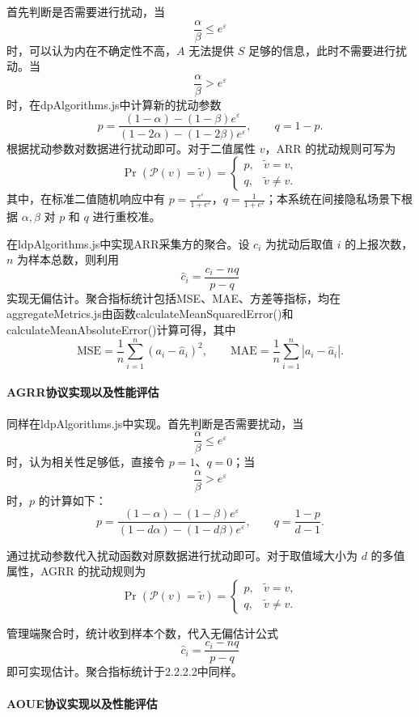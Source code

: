 \documentclass{cumcmthesis}
\numberwithin{equation}{section}
\numberwithin{figure}{section}
\numberwithin{table}{section}
\begin{document}
首先判断是否需要进行扰动，当
\[
\frac{\alpha}{\beta}\le e^{\varepsilon}
\]
时，可以认为内在不确定性不高，\(A\) 无法提供 \(S\) 足够的信息，此时不需要进行扰动。当
\[
\frac{\alpha}{\beta}> e^{\varepsilon}
\]
时，在dpAlgorithms.js中计算新的扰动参数
\[
p=\frac{(1-\alpha)-(1-\beta)e^{\varepsilon}}
{(1-2\alpha)-(1-2\beta)e^{\varepsilon}},\qquad q=1-p.
\]
根据扰动参数对数据进行扰动即可。对于二值属性 \(v\)，ARR 的扰动规则可写为
\[
\Pr(\mathcal{P}(v)=\tilde{v})=
\begin{cases}
p, & \tilde{v}=v,\\
q, & \tilde{v}\ne v.
\end{cases}
\]
其中，在标准二值随机响应中有 \(p=\frac{e^{\varepsilon}}{1+e^{\varepsilon}}\)，\(q=\frac{1}{1+e^{\varepsilon}}\)；本系统在间接隐私场景下根据 \(\alpha,\beta\) 对 \(p\) 和 \(q\) 进行重校准。

在ldpAlgorithms.js中实现ARR采集方的聚合。设 \(c_i\) 为扰动后取值 \(i\) 的上报次数，\(n\) 为样本总数，则利用
\[
\hat{c}_i=\frac{c_i-nq}{p-q}
\]
实现无偏估计。聚合指标统计包括MSE、MAE、方差等指标，均在aggregateMetrics.js由函数calculateMeanSquaredError()和calculateMeanAbsoluteError()计算可得，其中
\[
\mathrm{MSE}=\frac{1}{n}\sum_{i=1}^{n}(a_i-\hat{a}_i)^2,
\qquad
\mathrm{MAE}=\frac{1}{n}\sum_{i=1}^{n}|a_i-\hat{a}_i|.
\]

\paragraph{AGRR协议实现以及性能评估}

同样在ldpAlgorithms.js中实现。首先判断是否需要扰动，当
\[
\frac{\alpha}{\beta}\le e^{\varepsilon}
\]
时，认为相关性足够低，直接令 \(p=1\)、\(q=0\)；当
\[
\frac{\alpha}{\beta}> e^{\varepsilon}
\]
时，\(p\) 的计算如下：
\[
p=\frac{(1-\alpha)-(1-\beta)e^{\varepsilon}}
{(1-d\alpha)-(1-d\beta)e^{\varepsilon}},\qquad
q=\frac{1-p}{d-1}.
\]

通过扰动参数代入扰动函数对原数据进行扰动即可。对于取值域大小为 \(d\) 的多值属性，AGRR 的扰动规则为
\[
\Pr(\mathcal{P}(v)=\tilde{v})=
\begin{cases}
p, & \tilde{v}=v,\\
q, & \tilde{v}\ne v.
\end{cases}
\]

管理端聚合时，统计收到样本个数，代入无偏估计公式
\[
\hat{c}_i=\frac{c_i-nq}{p-q}
\]
即可实现估计。聚合指标统计于2.2.2.2中同样。

\paragraph{AOUE协议实现以及性能评估}
\end{document}
